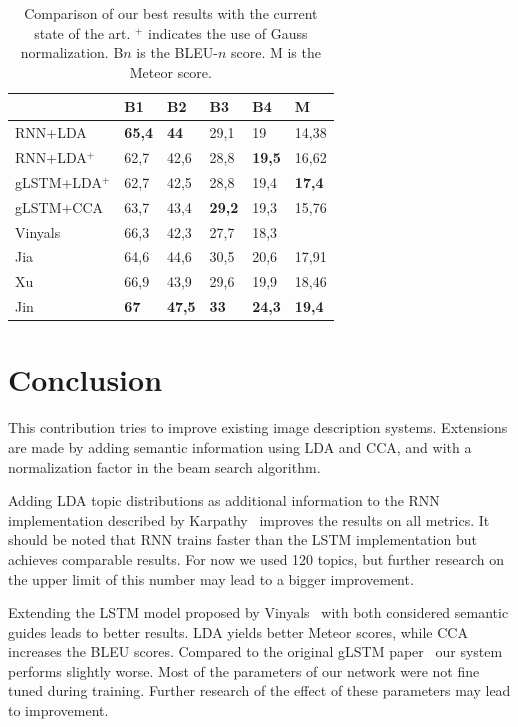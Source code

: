 \documentclass[twoside,twocolumn]{article}
\begin{document}
	\begin{table}
		\centering
		\begin{tabular}{llllll}
			~                  & B1 & B2 & B3 & B4 & M \\ \hline
			RNN+LDA            & \textbf{65,4}   & \textbf{44}     & 29,1   & 19     & 14,38  \\
			RNN+LDA$^+$      & 62,7   & 42,6   & 28,8   & \textbf{19,5}   & 16,62  \\
			gLSTM+LDA$^+$    & 62,7   & 42,5   & 28,8   & 19,4   & \textbf{17,4}   \\
			gLSTM+CCA          & 63,7   & 43,4   & \textbf{29,2}   & 19,3   & 15,76  \\ \hline
			Vinyals~\cite{Google}           & 66,3   & 42,3   & 27,7   & 18,3   & ~      \\
			Jia~\cite{Fernando2015}  & 64,6   & 44,6   & 30,5   & 20,6   & 17,91  \\
			Xu~\cite{Xu2015}     & 66,9   & 43,9   & 29,6   & 19,9   & 18,46  \\
			Jin~\cite{Jin2015}      & \textbf{67}    & \textbf{47,5}   & \textbf{33}     & \textbf{24,3}   & \textbf{19,4}   \\ \hline
		\end{tabular}
		\caption{Comparison of our best results with the current state of the art. $^+$ indicates the use of Gauss normalization. B$n$ is the BLEU-$n$ score. M is the Meteor score.}
		\label{tab:sota}
	\end{table}
	
	\section{Conclusion}
	This contribution tries to improve existing image description systems. Extensions are made by adding semantic information using LDA and CCA, and with a normalization factor in the beam search algorithm.
	
	Adding LDA topic distributions as additional information to the RNN implementation described by Karpathy~\cite{Karpathy2015} improves the results on all metrics. It should be noted that RNN trains faster than the LSTM implementation but achieves comparable results. For now we used 120 topics, but further research on the upper limit of this number may lead to a bigger improvement.
	
	Extending the LSTM model proposed by Vinyals~\cite{Google} with both considered semantic guides leads to better results. LDA yields better Meteor scores, while CCA increases the BLEU scores. Compared to the original gLSTM paper~\cite{Fernando2015} our system performs slightly worse. Most of the parameters of our network were not fine tuned during training. Further research of the effect of these parameters may lead to improvement.
	
\end{document}
